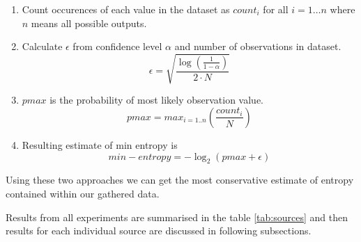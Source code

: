 \documentclass[
  print, %
  Table,   %
  nolof,     %
  nolot,     %
           oneside
]{fithesis3}
\begin{document}
  \begin{enumerate}
    \item Count occurences of each value in the dataset as $count_i$ for all $i=1 \dots n$ where $n$ means all possible outputs.
    \item Calculate $\epsilon$ from confidence level $\alpha$ and number of observations in dataset.
    $$\epsilon = \sqrt{\frac{\log(\frac{1}{1-\alpha})}{2\cdot N}}$$
    \item $pmax$ is the probability of most likely observation value.
    $$pmax = max_{i=1..n}(\frac{count_i}{N})$$
    \item Resulting estimate of min entropy is
    $$min-entropy =  -\log_2 (pmax + \epsilon)$$

  \end{enumerate}

  Using these two approaches we can get the most conservative estimate of entropy contained within our gathered data.

  Results from all experiments are summarised in the table \ref{tab:sources} and then results for each individual source are discussed in following subsections.
\end{document}
